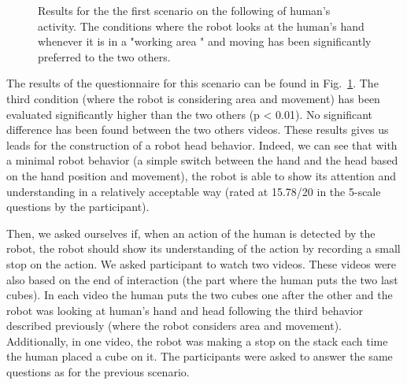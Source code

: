 \documentclass[english,a4paper,11pt,twoside]{StyleThese}
\begin{document}
\begin{figure}[!h]
\centering
    \caption{Results for the the first scenario on the following of human's activity. The conditions where the robot looks at the human's hand whenever it is in a "working area " and moving has been significantly preferred to the two others.}
    \label{fig:resSce2}
\end{figure}

The results of the questionnaire for this scenario can be found in Fig.~\ref{fig:resSce2}. The third condition (where the robot is considering area and movement) has been evaluated significantly higher than the two others (p < 0.01). No significant difference has been found between the two others videos. These results gives us leads for the construction of a robot head behavior. Indeed, we can see that with a minimal robot behavior (a simple switch between the hand and the head based on the hand position and movement), the robot is able to show its attention and understanding in a relatively acceptable way (rated at 15.78/20 in the 5-scale questions by the participant).

Then, we asked ourselves if, when an action of the human is detected by the robot, the robot should show its understanding of the action by recording a small stop on the action. We asked participant to watch two videos. These videos were also based on the end of interaction (the part where the human puts the two last cubes). In each video the human puts the two cubes one after the other and the robot was looking at human's hand and head following the third behavior described previously (where the robot considers area and movement). Additionally, in one video, the robot was making a stop on the stack each time the human placed a cube on it. The participants were asked to answer the same questions as for the previous scenario.
\end{document}
